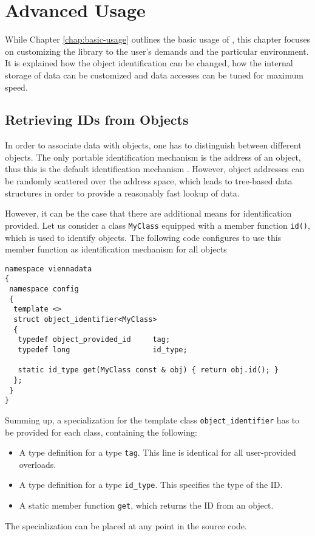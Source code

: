 \chapter{Advanced Usage} \label{chap:advanced-usage}

While Chapter \ref{chap:basic-usage} outlines the basic usage of {\ViennaData}, this chapter focuses
on customizing the library to the user's demands and the particular environment. It is explained how
the object identification can be changed, how the internal storage of data can be customized and data
accesses can be tuned for maximum speed.

\section{Retrieving IDs from Objects} \label{sec:id-retrieval}
In order to associate data with objects, one has to distinguish between different objects. The only portable identification mechanism
is the address of an object, thus this is the default identification mechanism {\ViennaData}.
However, object addresses can be randomly scattered over the address space, which leads to tree-based data structures in order to
provide a reasonably fast lookup of data.

However, it can be the case that there are additional means for identification provided.
Let us consider a class \lstinline|MyClass| equipped with a member function \lstinline|id()|, which
is used to identify objects. The following code configures {\ViennaData} to use this member function
as identification mechanism for all objects
\begin{lstlisting}
namespace viennadata
{
 namespace config
 {
  template <>
  struct object_identifier<MyClass>
  {
   typedef object_provided_id     tag;
   typedef long                   id_type;

   static id_type get(MyClass const & obj) { return obj.id(); }
  };
 }
}
\end{lstlisting}
Summing up, a specialization for the template class \lstinline|object_identifier| has to be provided
for each class, containing the following:
\begin{itemize}
 \item A type definition for a type \lstinline|tag|. This line is identical for all user-provided overloads.
 \item A type definition for a type \lstinline|id_type|. This specifies the type of the ID.
 \item A static member function \lstinline|get|, which returns the ID from an object.
\end{itemize}
The specialization can be placed at any point in the source code.

